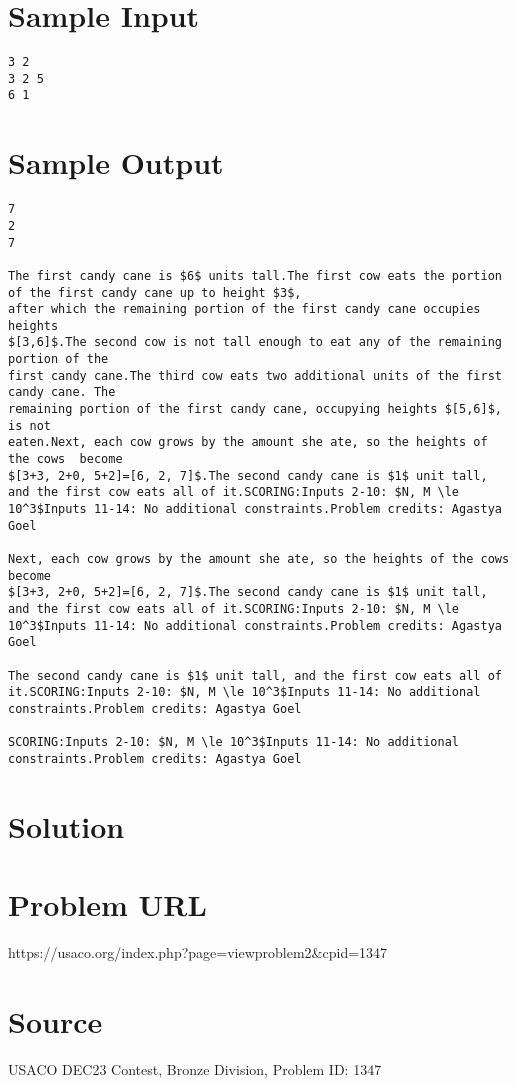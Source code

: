 \documentclass[12pt]{article}
\begin{document}
\section*{Sample Input}
\begin{verbatim}
3 2
3 2 5
6 1
\end{verbatim}

\section*{Sample Output}
\begin{verbatim}
7
2
7

The first candy cane is $6$ units tall.The first cow eats the portion of the first candy cane up to height $3$,
after which the remaining portion of the first candy cane occupies heights
$[3,6]$.The second cow is not tall enough to eat any of the remaining portion of the
first candy cane.The third cow eats two additional units of the first candy cane. The
remaining portion of the first candy cane, occupying heights $[5,6]$, is not
eaten.Next, each cow grows by the amount she ate, so the heights of the cows  become
$[3+3, 2+0, 5+2]=[6, 2, 7]$.The second candy cane is $1$ unit tall, and the first cow eats all of it.SCORING:Inputs 2-10: $N, M \le 10^3$Inputs 11-14: No additional constraints.Problem credits: Agastya Goel

Next, each cow grows by the amount she ate, so the heights of the cows  become
$[3+3, 2+0, 5+2]=[6, 2, 7]$.The second candy cane is $1$ unit tall, and the first cow eats all of it.SCORING:Inputs 2-10: $N, M \le 10^3$Inputs 11-14: No additional constraints.Problem credits: Agastya Goel

The second candy cane is $1$ unit tall, and the first cow eats all of it.SCORING:Inputs 2-10: $N, M \le 10^3$Inputs 11-14: No additional constraints.Problem credits: Agastya Goel

SCORING:Inputs 2-10: $N, M \le 10^3$Inputs 11-14: No additional constraints.Problem credits: Agastya Goel
\end{verbatim}

\section*{Solution}


\section*{Problem URL}
https://usaco.org/index.php?page=viewproblem2&cpid=1347

\section*{Source}
USACO DEC23 Contest, Bronze Division, Problem ID: 1347
\end{document}
